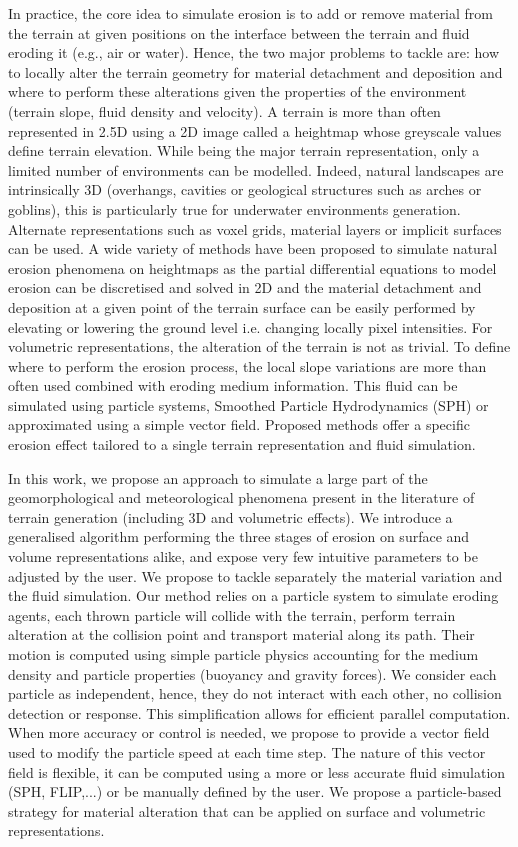In practice, the core idea to simulate erosion is to add or remove material from the terrain at given positions on the interface between the terrain and fluid eroding it (e.g., air or water). Hence, the two major problems to tackle are: how to locally alter the terrain geometry for material detachment and deposition and where to perform these alterations given the properties of the environment (terrain slope, fluid density and velocity).
A terrain is more than often represented in 2.5D using a 2D image called a heightmap whose greyscale values define terrain elevation. While being the major terrain representation, only a limited number of environments can be modelled. Indeed, natural landscapes are intrinsically 3D (overhangs, cavities or geological structures such as arches or goblins), this is particularly true for underwater environments generation. Alternate representations such as voxel grids, material layers or implicit surfaces can be used. A wide variety of methods have been proposed to simulate natural erosion phenomena on heightmaps as the partial differential equations to model erosion can be discretised and solved in 2D and the material detachment and deposition at a given point of the terrain surface can be easily performed by elevating or lowering the ground level i.e. changing locally pixel intensities.
For volumetric representations, the alteration of the terrain is not as trivial.
To define where to perform the erosion process, the local slope variations are more than often used combined with eroding medium information. This fluid can be simulated using particle systems, Smoothed Particle Hydrodynamics (SPH) \cite{Kristof2009} or approximated using a simple vector field.
Proposed methods offer a specific erosion effect tailored to a single terrain representation and fluid simulation.

In this work, we propose an approach to simulate a large part of the geomorphological and meteorological phenomena present in the literature of terrain generation (including 3D and volumetric effects). We introduce a generalised algorithm performing the three stages of erosion on surface and volume representations alike, and expose very few intuitive parameters to be adjusted by the user. %
We propose to tackle separately the material variation and the fluid simulation. Our method relies on a particle system to simulate eroding agents, each thrown particle will collide with the terrain, perform terrain alteration at the collision point and transport material along its path.
Their motion is computed using simple particle physics accounting for the medium density and particle properties (buoyancy and gravity forces). We consider each particle as independent, hence, they do not interact with each other, no collision detection or response. This simplification allows for efficient parallel computation.
When more accuracy or control is needed, we propose to provide a vector field used to modify the particle speed at each time step. The nature of this vector field is flexible, it can be computed using a more or less accurate fluid simulation (SPH, FLIP,...) or be manually defined by the user. We propose a particle-based strategy for material alteration that can be applied on surface and volumetric representations.

